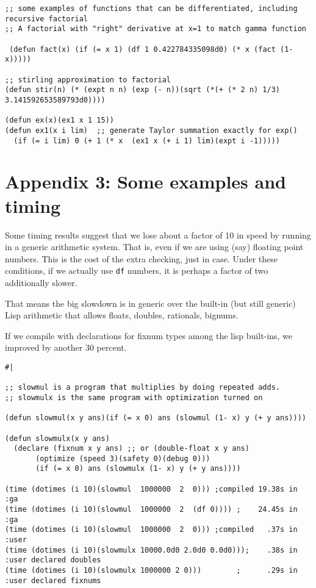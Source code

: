 \documentclass{article}
\begin{document}
{{{{\begin{verbatim}
;; some examples of functions that can be differentiated, including recursive factorial
;; A factorial with "right" derivative at x=1 to match gamma function

 (defun fact(x) (if (= x 1) (df 1 0.422784335098d0) (* x (fact (1- x)))))

;; stirling approximation to factorial
(defun stir(n) (* (expt n n) (exp (- n))(sqrt (*(+ (* 2 n) 1/3) 3.141592653589793d0))))

(defun ex(x)(ex1 x 1 15))
(defun ex1(x i lim)  ;; generate Taylor summation exactly for exp()
  (if (= i lim) 0 (+ 1 (* x  (ex1 x (+ i 1) lim)(expt i -1)))))

\end{verbatim}
\section*{Appendix 3: Some examples and timing}

Some timing results suggest that we lose about a factor of 10 in speed
by running in a generic arithmetic system.  That is, even if we are
using (say) floating point numbers. This is the cost of the extra
checking, just in case.  Under these conditions, if we actually use
{\tt df} numbers, it is perhaps a factor of two additionally slower.

That means the big slowdown is in generic over the built-in (but still generic)
Lisp arithmetic that allows floats, doubles, rationals, bignums.

If we compile with declarations for fixnum types among the lisp built-ins,
we improved by another 30 percent.
\begin{verbatim}
#|

;; slowmul is a program that multiplies by doing repeated adds.
;; slowmulx is the same program with optimization turned on

(defun slowmul(x y ans)(if (= x 0) ans (slowmul (1- x) y (+ y ans))))

(defun slowmulx(x y ans)
  (declare (fixnum x y ans) ;; or (double-float x y ans)
	   (optimize (speed 3)(safety 0)(debug 0)))
	   (if (= x 0) ans (slowmulx (1- x) y (+ y ans))))

(time (dotimes (i 10)(slowmul  1000000  2  0))) ;compiled 19.38s in :ga
(time (dotimes (i 10)(slowmul  1000000  2  (df 0)))) ;    24.45s in :ga
(time (dotimes (i 10)(slowmul  1000000  2  0))) ;compiled   .37s in :user
(time (dotimes (i 10)(slowmulx 10000.0d0 2.0d0 0.0d0)));    .38s in :user declared doubles
(time (dotimes (i 10)(slowmulx 1000000 2 0)))        ;      .29s in :user declared fixnums


\end{verbatim}}}}}
\end{document}
